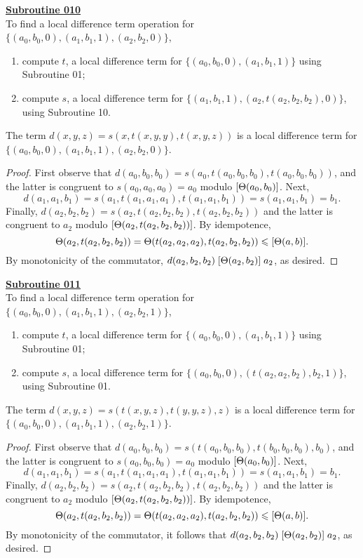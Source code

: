 \noindent \underline{\textbf{Subroutine 010}}\\[4pt]
To find a local difference term operation for
$\{(a_0, b_0, 0), (a_1, b_1, 1),  (a_2, b_2, 0)\}$,
\begin{enumerate}
\item compute $t$, a local difference term for
$\{(a_0, b_0, 0), (a_1, b_1, 1)\}$ using Subroutine 01;
\item compute $s$, a local difference term for
$\{(a_1, b_1, 1),  (a_2, t(a_2,b_2,b_2), 0)\}$, using
Subroutine 10.
\end{enumerate}
 The term
$d(x,y,z) = s(x, t(x,y,y), t(x,y,z))$
is a local difference term for
$\{(a_0, b_0, 0), (a_1, b_1, 1),  (a_2, b_2, 0)\}$.
\begin{proof}
First observe that
$d(a_0, b_0, b_0)=s(a_0, t(a_0,b_0,b_0), t(a_0,b_0,b_0))$, and the latter is
congruent to $s(a_0, a_0, a_0) = a_0$ modulo $[\Theta(a_0, b_0)]$.
Next,
\[
d(a_1, a_1, b_1)
=s(a_1, t(a_1,a_1, a_1), t(a_1,a_1,b_1))
=s(a_1, a_1, b_1) = b_1.\]
Finally, $d(a_2, b_2, b_2)=s(a_2, t(a_2,b_2,b_2), t(a_2,b_2,b_2))$
and the latter is congruent to $a_2$ modulo
$\mathrel{[\Theta(a_2, t(a_2,b_2,b_2))]}$.
By idempotence,
\[\Theta(a_2, t(a_2,b_2,b_2)) =
\Theta(t(a_2,a_2,a_2), t(a_2,b_2,b_2))
\leqslant [\Theta(a,b)].\]
By monotonicity of the commutator,
$d(a_2, b_2, b_2)\mathrel{[\Theta(a_2, b_2)]} a_2$, as desired.
\end{proof}
\medskip

\noindent \underline{\textbf{Subroutine 011}}\\[4pt]
To find a local difference term operation for
$\{(a_0, b_0, 0), (a_1, b_1, 1),  (a_2, b_2, 1)\}$,
\begin{enumerate}
\item compute $t$, a local difference term for
$\{(a_0, b_0, 0), (a_1, b_1, 1)\}$ using Subroutine 01;
\item compute $s$, a local difference term for
$\{(a_0, b_0, 0),  (t(a_2,a_2,b_2), b_2, 1)\}$, using
Subroutine 01.
\end{enumerate}
 The term
$d(x,y,z) = s(t(x,y,z), t(y,y,z),z)$
is a local difference term for
$\{(a_0, b_0, 0), (a_1, b_1, 1),  (a_2, b_2, 1)\}$.

\begin{proof}
First observe that
$d(a_0, b_0, b_0)=
s(t(a_0,b_0,b_0), t(b_0,b_0,b_0), b_0)$,
and the latter is congruent to $s(a_0, b_0, b_0) = a_0$ modulo
$[\Theta(a_0, b_0)]$. Next,
\[
d(a_1, a_1, b_1)
=s(a_1, t(a_1,a_1, a_1), t(a_1,a_1,b_1))
=s(a_1, a_1, b_1) = b_1.\]
Finally,
$d(a_2, b_2, b_2)=s(a_2, t(a_2,b_2,b_2), t(a_2,b_2,b_2))$
and the latter is congruent to $a_2$ modulo
$\mathrel{[\Theta(a_2, t(a_2,b_2,b_2))]}$.
By idempotence,
\[\Theta(a_2, t(a_2,b_2,b_2)) =
\Theta(t(a_2,a_2,a_2), t(a_2,b_2,b_2))
\leqslant [\Theta(a,b)].\]
By monotonicity of the commutator, it follows that
$d(a_2, b_2, b_2)\mathrel{[\Theta(a_2, b_2)]} a_2$, as desired.
\end{proof}

